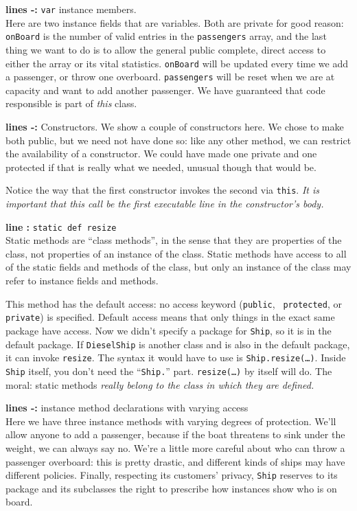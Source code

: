 \begin{description}
\item{\bf lines -:} {\tt var} instance members.\\
Here are two instance fields that are variables.  Both
are private for good reason: {\tt onBoard} is the number of valid entries in
the {\tt passengers} array, and the last thing we want to do is to allow the
general public complete, direct access to either the array or its vital
statistics. {\tt onBoard} will be updated
every time we add a passenger, or throw one overboard. {\tt passengers} will be
reset when we are at capacity and want to add another passenger.  We 
have guaranteed that code responsible is part of {\em this} class.

\item{\bf lines -:}  Constructors.
We show a couple of constructors here.  We chose to
make both public, but we need not have done so: like any other method, we can
restrict the availability of a constructor.  We could have made one private and
one protected if that is really what we needed, unusual though that would be.

Notice the way that the first constructor invokes the second via {\tt this}.
{\em It is important that this call be the first executable line in the constructor's body.}

\item{\bf line :} {\tt static def resize}\\
Static methods are ``class methods'', in the sense that they are properties
of the class, not properties of an instance of the class.
Static methods have access to all of the static fields and methods
of the class, but only an instance of the class may refer to instance fields and
methods.  

This method has the default access: no access keyword ({\tt public}, {\tt
  protected}, or {\tt private}) is specified. Default access means that only
things in the exact same package have access. Now we didn't specify a package
for {\tt Ship}, so it is in the default package. If {\tt DieselShip} is
another class and is also in the default package, it can invoke {\tt resize}.
The syntax it would have to use is {\tt Ship.resize(\ldots)}. Inside {\tt
  Ship} itself, you don't need the ``{\tt Ship.}'' part. {\tt resize(\ldots)}
by itself will do. The moral: static methods {\em really belong to the class
  in which they are defined.}

\item{\bf lines -:} instance
  method declarations with varying access\\ Here we have three instance
  methods with varying degrees of protection. We'll allow anyone to add a
  passenger, because if the boat threatens to sink under the weight, we can
  always say no. We're a little more careful about who can throw a passenger
  overboard: this is pretty drastic, and different kinds of ships may have
  different policies. Finally, respecting its customers' privacy, {\tt Ship}
  reserves to its package and its subclasses the right to prescribe how
  instances show who is on board.


\end{description}
